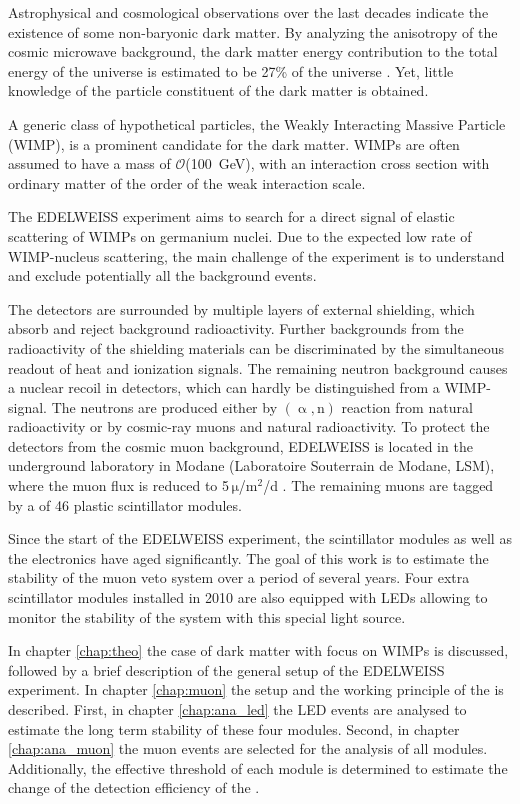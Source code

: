 Astrophysical and cosmological observations over the last decades indicate the existence of some non-baryonic dark matter. By analyzing the anisotropy of the cosmic microwave background, the dark matter energy contribution to the total energy of the universe is estimated to be 27\% of the universe \cite{Pla16}. Yet, little knowledge of the particle constituent of the dark matter is obtained.

A generic class of hypothetical particles, the Weakly Interacting Massive Particle (WIMP), is a prominent candidate for the dark matter. WIMPs are often assumed to have a mass of $\mathcal{O}$(\SI{100}{GeV}), with an interaction cross section with ordinary matter of the order of the weak interaction scale.

The EDELWEISS experiment aims to search for a direct signal of elastic scattering of WIMPs on germanium nuclei. Due to the expected low rate of WIMP-nucleus scattering, the main challenge of the experiment is to understand and exclude potentially all the background events.

The detectors are surrounded by multiple layers of external shielding, which absorb and reject background radioactivity. Further backgrounds from the radioactivity of the shielding materials can be discriminated by the simultaneous readout of heat and ionization signals. The remaining neutron background causes a nuclear recoil in detectors, which can hardly be distinguished from a WIMP-signal. The neutrons are produced either by $(\upalpha,\mathrm{n})$ reaction from natural radioactivity or by cosmic-ray muons and natural radioactivity. To protect the detectors from the cosmic muon background, EDELWEISS is located in the underground laboratory in Modane (Laboratoire Souterrain de Modane, LSM), where the muon flux is reduced to 5\,$\mathrm{\mu}$/$\mathrm{m}^{2}$/d \cite{Sch13a}. The remaining muons are tagged by a \mvs{} of 46 plastic scintillator modules.

Since the start of the EDELWEISS experiment, the scintillator modules as well as the electronics have aged significantly. The goal of this work is to estimate the stability of the muon veto system over a period of several years. Four extra scintillator modules installed in 2010 are also equipped with LEDs allowing to monitor the stability of the system with this special light source.

In chapter \ref{chap:theo} the case of dark matter with focus on WIMPs is discussed, followed by a brief description of the general setup of the EDELWEISS experiment. In chapter \ref{chap:muon} the setup and the working principle of the \mvs{} is described. First, in chapter \ref{chap:ana_led} the LED events are analysed to estimate the long term stability of these four modules. Second, in chapter \ref{chap:ana_muon} the muon events are selected for the analysis of all modules. Additionally, the effective threshold of each module is determined to estimate the change of the detection efficiency of the \mvs.

